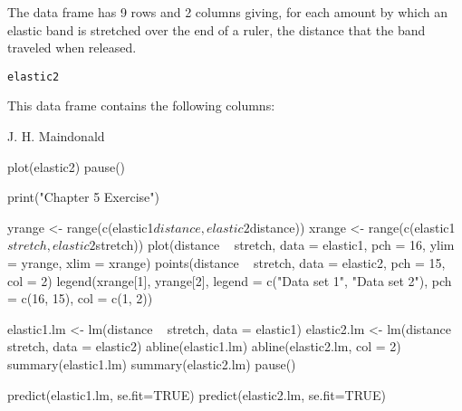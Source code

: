 \begin{Description}\relax
The  data frame has 9 rows and 2 columns
giving, for each amount by which an elastic band is stretched
over the end of a ruler, the distance that the band traveled when
released.
\end{Description}
\begin{Usage}
\begin{verbatim}elastic2\end{verbatim}
\end{Usage}
\begin{Format}\relax
This data frame contains the following columns:
\end{Format}
\begin{Source}\relax
J. H. Maindonald
\end{Source}
\begin{Examples}
\begin{ExampleCode}
plot(elastic2)
pause()

print("Chapter 5 Exercise")

yrange <- range(c(elastic1$distance, elastic2$distance))
xrange <- range(c(elastic1$stretch, elastic2$stretch))
plot(distance ~ stretch, data = elastic1, pch = 16, ylim = yrange, xlim = 
xrange)
points(distance ~ stretch, data = elastic2, pch = 15, col = 2)
legend(xrange[1], yrange[2], legend = c("Data set 1", "Data set 2"), pch = 
c(16, 15), col = c(1, 2))

elastic1.lm <- lm(distance ~ stretch, data = elastic1)
elastic2.lm <- lm(distance ~ stretch, data = elastic2)
abline(elastic1.lm)
abline(elastic2.lm, col = 2)
summary(elastic1.lm)
summary(elastic2.lm)
pause()

predict(elastic1.lm, se.fit=TRUE)
predict(elastic2.lm, se.fit=TRUE)
\end{ExampleCode}
\end{Examples}

